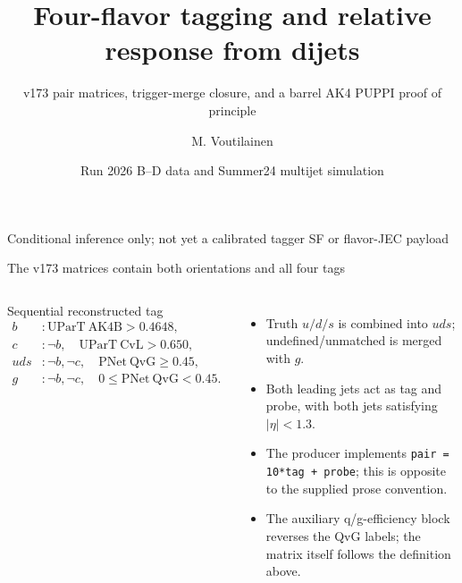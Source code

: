 \documentclass[aspectratio=169,10pt]{beamer}
\title{Four-flavor tagging and relative response from dijets}
\subtitle{v173 pair matrices, trigger-merge closure, and a barrel AK4 PUPPI proof of principle}
\author{M. Voutilainen}
\date{Run 2026 B--D data and Summer24 multijet simulation}
\begin{document}
\begin{frame}[plain]
  \titlepage
  \vfill
  \begin{center}
    \color{cmsamber}\small Conditional inference only; not yet a calibrated tagger SF or flavor-JEC payload
  \end{center}
\end{frame}

\begin{frame}{The v173 matrices contain both orientations and all four tags}
\begin{columns}[T,onlytextwidth]
\begin{block}{Sequential reconstructed tag}
\begin{align*}
b &: \mathrm{UParT\ AK4B}>0.4648,\\
c &: \neg b,\quad \mathrm{UParT\ CvL}>0.650,\\
uds &: \neg b,\neg c,\quad \mathrm{PNet\ QvG}\geq0.45,\\
g &: \neg b,\neg c,\quad 0\leq\mathrm{PNet\ QvG}<0.45.
\end{align*}
\end{block}
\begin{itemize}
\item Truth $u/d/s$ is combined into $uds$; undefined/unmatched is merged with $g$.
\item Both leading jets act as tag and probe, with both jets satisfying $|\eta|<1.3$.
\item The producer implements \texttt{pair = 10*tag + probe}; this is opposite to the supplied prose convention.
\item The auxiliary q/g-efficiency block reverses the QvG labels; the matrix itself follows the definition above.
\end{itemize}
\end{columns}
\end{frame}
\end{document}
